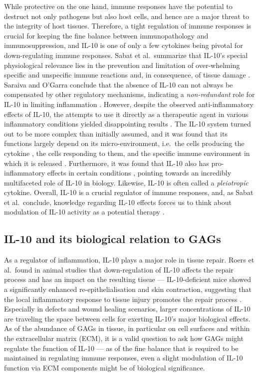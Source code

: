 While protective on the one hand, immune responses have the potential to
destruct not only pathogens but also host cells, and hence are a major threat to
the integrity of host tissues. Therefore, a tight regulation of immune responses
is crucial for keeping the fine balance between immunopathology and
immunosuppression, and IL-10 is one of only a few cytokines being pivotal for
down-regulating immune responses. Sabat et al.\ summarize that IL-10's special
physiological relevance lies in the prevention and limitation of over-whelming
specific and unspecific immune reactions and, in consequence, of tissue damage
\cite{sabat_bio_il10_review_2010}. Saraiva and O'Garra conclude that the absence
of IL-10 can not always be compensated by other regulatory mechanisms,
indicating a \textit{non-redundant} role for IL-10 in limiting inflammation
\cite{saraiva_ogarra_2010}. However, despite the observed anti-inflammatory
effects of IL-10, the attempts to use it directly as a therapeutic agent in
various inflammatory conditions yielded disappointing results
\cite{il10_therapy_review_2003}. The IL-10 system turned out to be more complex
than initially assumed, and it was found that its functions largely depend on
its micro-environment, i.e.\ the cells producing the cytokine
\cite{roers_mueller_2008}, the cells responding to them, and the specific immune
environment in which it is released \cite{mosser_il10_newperspectives_2008}.
Furthermore, it was found that IL-10 also has pro-inflammatory effects in
certain conditions \cite{lauw_il10_proinflamm_2000}, pointing towards an
incredibly multifaceted role of IL-10 in biology. Likewise, IL-10 is often
called a \textit{pleiotropic} cytokine. Overall, IL-10 is a crucial regulator of
immune responses, and, as Sabat et al.\ conclude, knowledge regarding IL-10
effects forces us to think about modulation of IL-10 activity as a potential
therapy \cite{sabat_bio_il10_review_2010}.


\subsection{IL-10 and its biological relation to GAGs}

As a regulator of inflammation, IL-10 plays a major role in tissue repair. Roers
et al.\ found in animal studies that down-regulation of IL-10 affects the repair
process and has an impact on the resulting tissue --- IL-10-deficient mice
showed a significantly enhanced re-epithelialisation and skin contraction,
suggesting that the local inflammatory response to tissue injury promotes the
repair process \cite{roers_il10mice_woundhealing_2007}. Especially in defects
and wound healing scenarios, larger concentrations of IL-10 are traveling the
space between cells for exerting IL-10's major biological effects. As of the
abundance of GAGs in tissue, in particular on cell surfaces and within the
extracellular matrix (ECM), it is a valid question to ask how GAGs might
regulate the function of IL-10 --- as of the fine balance that is required to be
maintained in regulating immune responses, even a slight modulation of IL-10
function via ECM components might be of biological significance.

